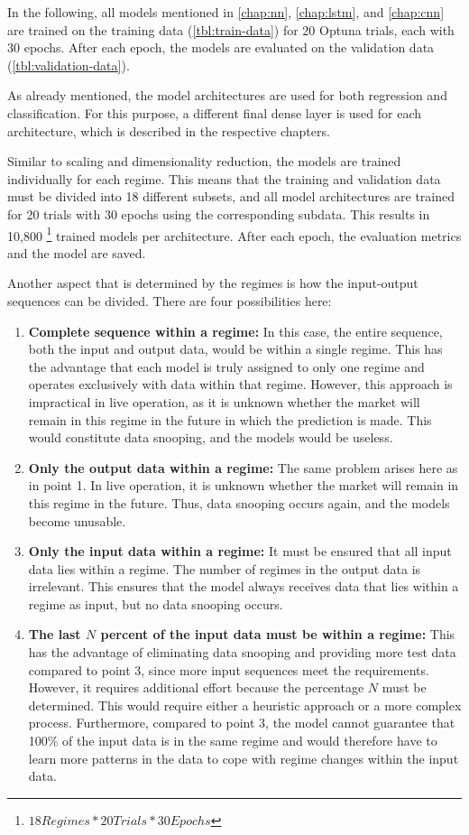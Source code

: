In the following, all models mentioned in \autoref{chap:nn}, \autoref{chap:lstm}, and \autoref{chap:cnn} are trained on the training data (\autoref{tbl:train-data}) for 20 Optuna trials, each with 30 epochs.
After each epoch, the models are evaluated on the validation data (\autoref{tbl:validation-data}).

As already mentioned, the model architectures are used for both regression and classification.
For this purpose, a different final dense layer is used for each architecture, which is described in the respective chapters.

Similar to scaling and dimensionality reduction, the models are trained individually for each regime.
This means that the training and validation data must be divided into 18 different subsets, and all model architectures are trained for 20 trials with 30 epochs using the corresponding subdata.
This results in 10,800 \footnote{$18 Regimes * 20 Trials * 30 Epochs$} trained models per architecture.
After each epoch, the evaluation metrics and the model are saved.

Another aspect that is determined by the regimes is how the input-output sequences can be divided.
There are four possibilities here:

\begin{enumerate}
    \item \textbf{Complete sequence within a regime:} In this case, the entire sequence, both the input and output data, would be within a single regime.
    This has the advantage that each model is truly assigned to only one regime and operates exclusively with data within that regime.
    However, this approach is impractical in live operation, as it is unknown whether the market will remain in this regime in the future in which the prediction is made.
    This would constitute data snooping, and the models would be useless.
    \item \textbf{Only the output data within a regime:} The same problem arises here as in point 1.
    In live operation, it is unknown whether the market will remain in this regime in the future.
    Thus, data snooping occurs again, and the models become unusable.
    \item \textbf{Only the input data within a regime:} It must be ensured that all input data lies within a regime.
    The number of regimes in the output data is irrelevant.
    This ensures that the model always receives data that lies within a regime as input, but no data snooping occurs.
    \item \textbf{The last $N$ percent of the input data must be within a regime:} This has the advantage of eliminating data snooping and providing more test data compared to point 3, since more input sequences meet the requirements.
    However, it requires additional effort because the percentage $N$ must be determined.
    This would require either a heuristic approach or a more complex process.
    Furthermore, compared to point 3, the model cannot guarantee that 100\% of the input data is in the same regime and would therefore have to learn more patterns in the data to cope with regime changes within the input data.
\end{enumerate}


